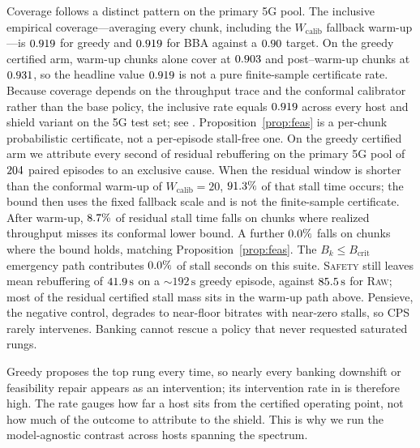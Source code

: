 Coverage follows a distinct pattern on the primary \mbox{5G} pool.
The inclusive empirical coverage---averaging every chunk, including the \(W_{\mathrm{calib}}\) fallback warm-up---is \(0.919\) for greedy and \(0.919\) for BBA against a \(0.90\) target.
On the greedy certified arm, warm-up chunks alone cover at \(0.903\) and post--warm-up chunks at \(0.931\), so the headline value \(0.919\) is not a pure finite-sample certificate rate.
Because coverage depends on the throughput trace and the conformal calibrator rather than the base policy, the inclusive rate equals \(0.919\) across every host and shield variant on the \mbox{5G} test set; see .
Proposition~\ref{prop:feas} is a per-chunk probabilistic certificate, not a per-episode stall-free one. On the greedy certified arm we attribute every second of residual rebuffering on the primary \mbox{5G} pool of \(204\) paired episodes to an exclusive cause. When the residual window is shorter than the conformal warm-up of \(W_{\mathrm{calib}}{=}20\), \(91.3\%\) of that stall time occurs; the bound then uses the fixed fallback scale and is not the finite-sample certificate. After warm-up, \(8.7\%\) of residual stall time falls on chunks where realized throughput misses its conformal lower bound. A further \(0.0\%\) falls on chunks where the bound holds, matching Proposition~\ref{prop:feas}. The \(B_k\le B_{\mathrm{crit}}\) emergency path contributes \(0.0\%\) of stall seconds on this suite.
\textsc{Safety} still leaves mean rebuffering of \(41.9\,\mathrm{s}\) on a \(\sim\!192\,\mathrm{s}\) greedy episode, against \(85.5\,\mathrm{s}\) for \textsc{Raw}; most of the residual certified stall mass sits in the warm-up path above.
Pensieve, the negative control, degrades to near-floor bitrates with near-zero stalls, so CPS rarely intervenes. Banking cannot rescue a policy that never requested saturated rungs.



Greedy proposes the top rung every time, so nearly every banking downshift or feasibility repair appears as an intervention; its intervention rate in  is therefore high. The rate gauges how far a host sits from the certified operating point, not how much of the outcome to attribute to the shield. This is why we run the model-agnostic contrast across hosts spanning the spectrum.

